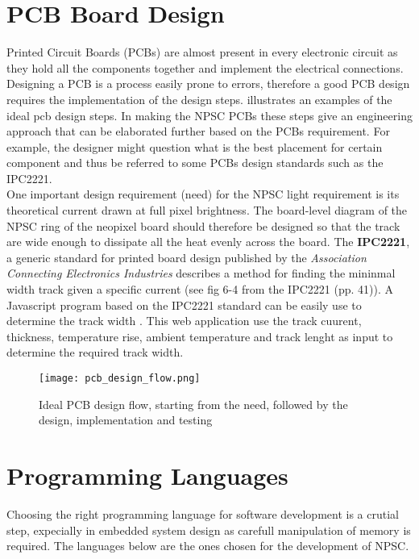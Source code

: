 \section{PCB Board Design}\label{PCB_requirement}
Printed Circuit Boards (PCBs) are almost present in every electronic circuit as they hold all the components together and implement the electrical connections. Designing a PCB is a process easily prone to errors, therefore a good PCB design requires the implementation of the design steps.  illustrates an examples of the ideal pcb design steps. In making the NPSC PCBs these steps give an engineering approach that can be elaborated further based on the PCBs requirement. For example, the designer might question what is the best placement for certain component and thus be referred to some PCBs design standards such as the IPC2221.\\
One important design requirement (need) for the NPSC light requirement is its theoretical current drawn at full pixel brightness. The board-level diagram of the NPSC ring of the neopixel board should therefore be designed so that the track are wide enough to dissipate all the heat evenly across the board. The \textbf{IPC2221}, a generic standard for printed board design published by the \textit{Association Connecting Electronics Industries} \cite{pcb_design} describes a method for finding the mininmal width track given a specific current (see fig 6-4 from the IPC2221 \cite{pcb_design}(pp. 41)). A Javascript program based on the IPC2221 standard can be easily use to determine the track width \cite{pcb_track_width}. This web application use the track cuurent, thickness, temperature rise, ambient temperature and track lenght as input to determine the required track width.      
\begin{figure}[ht]
\centering
\texttt{[image: pcb\_design\_flow.png]}
\caption{Ideal PCB design flow, starting from the need, followed by the design, implementation and testing}
\label{fig:pcb_design_flow}
\end{figure}

\section{Programming Languages}
Choosing the right programming language for software development is a crutial step, expecially in embedded system design as carefull manipulation of memory is required. The languages below are the ones chosen for the development of NPSC. 
